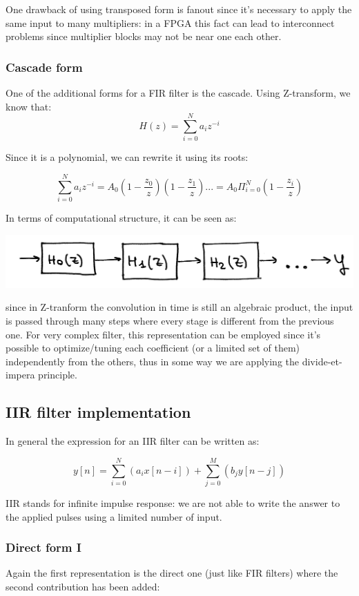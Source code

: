 One drawback of using transposed form is fanout since it's necessary to apply the same input to many multipliers: in a FPGA this fact can lead to interconnect problems since multiplier blocks may not be near one each other.

\subsubsection{Cascade form}
One of the additional forms for a FIR filter is the cascade. Using Z-transform, we know that:
$$H(z)= \sum_{i=0}^{N} a_i z^{-i} $$

Since it is a polynomial, we can rewrite it using its roots:

$$\sum_{i=0}^{N} a_i z^{-i}= A_0 (1-\frac{z_0}{z}) (1-\frac{z_1}{z})... = A_0 \Pi_{i=0}^{N}(1-\frac{z_i}{z}) $$

In terms of computational structure, it can be seen as:
\begin{center}
  \includegraphics[width=0.7\linewidth]{img/img1/05}
\end{center}

since in Z-tranform the convolution in time is still an algebraic product, the input is passed through many steps where every stage is different from the previous one. For very complex filter, this representation can be employed since it's possible to optimize/tuning each coefficient (or a limited set of them) independently from the others, thus in some way we are applying the divide-et-impera principle.

\subsection{IIR filter implementation}
In general the expression for an IIR filter can be written as:

$$y[n]=\sum_{i=0}^{N} (a_i x[n-i]) + \sum_{j=0}^{M} (b_j y[n-j]) $$

IIR stands for infinite impulse response: we are not able to write the answer to the applied pulses using a limited number of input.

\subsubsection{Direct form I}
Again the first representation is the direct one (just like FIR filters) where the second contribution has been added:

